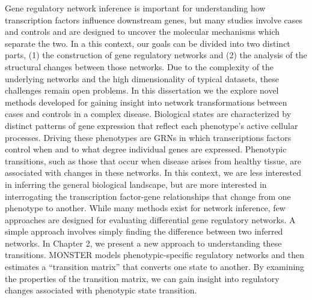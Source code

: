 Gene regulatory network inference is important for understanding how transcription factors influence downstream genes, but many studies involve cases and controls and are designed to uncover the molecular mechanisms which separate the two.  In a this context, our goals can be divided into two distinct parts, (1) the construction of gene regulatory networks and (2) the analysis of the structural changes between those networks. Due to the complexity of the underlying networks and the high dimensionality of typical datasets, these challenges remain open problems. In this dissertation we the explore novel methods developed for gaining insight into network transformations between cases and controls in a complex disease.
Biological states are characterized by distinct patterns of gene expression that reflect each phenotype's active cellular processes. Driving these phenotypes are GRNs in which transcriptions factors control when and to what degree individual genes are expressed. Phenotypic transitions, such as those that occur when disease arises from healthy tissue, are associated with changes in these networks. In this context, we are less interested in inferring the general biological landscape, but are more interested in interrogating the transcription factor-gene relationships that change from one phenotype to another.  While many methods exist for network inference, few approaches are designed for evaluating differential gene regulatory networks.  A simple approach involves simply finding the difference between two inferred networks. In Chapter 2, we present a new approach to understanding these transitions. MONSTER models phenotypic-specific regulatory networks and then estimates a ``transition matrix'' that converts one state to another. By examining the properties of the transition matrix, we can gain insight into regulatory changes associated with phenotypic state transition.
